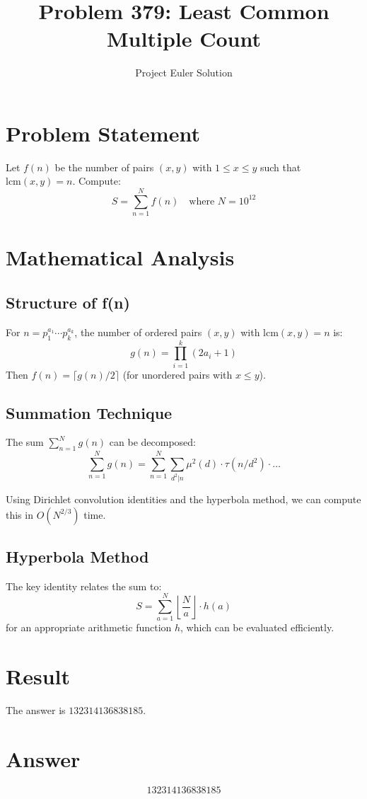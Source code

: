 \documentclass{article}
\title{Problem 379: Least Common Multiple Count}
\author{Project Euler Solution}
\date{}
\begin{document}
\maketitle

\section{Problem Statement}
Let $f(n)$ be the number of pairs $(x,y)$ with $1 \leq x \leq y$ such that $\text{lcm}(x,y) = n$. Compute:
\[
S = \sum_{n=1}^{N} f(n) \quad \text{where } N = 10^{12}
\]

\section{Mathematical Analysis}

\subsection{Structure of f(n)}
For $n = p_1^{a_1} \cdots p_k^{a_k}$, the number of ordered pairs $(x,y)$ with $\text{lcm}(x,y) = n$ is:
\[
g(n) = \prod_{i=1}^{k} (2a_i + 1)
\]
Then $f(n) = \lceil g(n)/2 \rceil$ (for unordered pairs with $x \leq y$).

\subsection{Summation Technique}
The sum $\sum_{n=1}^{N} g(n)$ can be decomposed:
\[
\sum_{n=1}^{N} g(n) = \sum_{n=1}^{N} \sum_{d^2 | n} \mu^2(d) \cdot \tau(n/d^2) \cdot \ldots
\]

Using Dirichlet convolution identities and the hyperbola method, we can compute this in $O(N^{2/3})$ time.

\subsection{Hyperbola Method}
The key identity relates the sum to:
\[
S = \sum_{a=1}^{N} \left\lfloor \frac{N}{a} \right\rfloor \cdot h(a)
\]
for an appropriate arithmetic function $h$, which can be evaluated efficiently.

\section{Result}
The answer is $\boxed{132314136838185}$.

\section{Answer}

\[
\boxed{132314136838185}
\]
\end{document}
